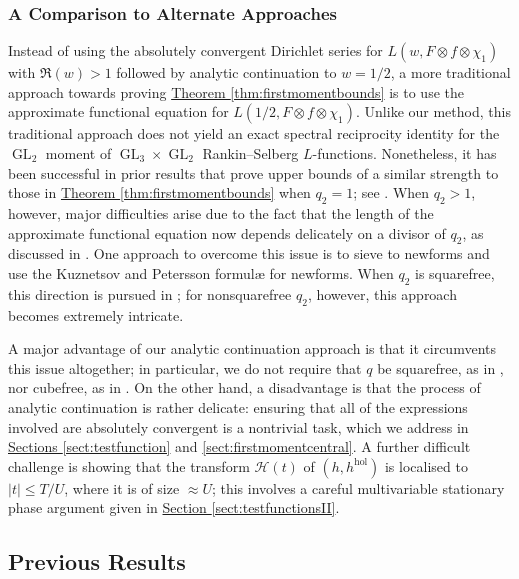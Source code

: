 \documentclass[11pt,a4paper]{amsart}
\newcommand{\HH}{\mathcal{H}}
\newcommand{\hol}{\mathrm{hol}}
\DeclareMathOperator{\GL}{GL}
\numberwithin{equation}{section}
\theoremstyle{remark}
\theoremstyle{definition}
\begin{document}
\subsubsection{A Comparison to Alternate Approaches}

Instead of using the absolutely convergent Dirichlet series for $L(w,F \otimes f \otimes \chi_1)$ with $\Re(w) > 1$ followed by analytic continuation to $w = 1/2$, a more traditional approach towards proving \hyperref[thm:firstmomentbounds]{Theorem \ref*{thm:firstmomentbounds}} is to use the approximate functional equation for $L(1/2,F \otimes f \otimes \chi_1)$. Unlike our method, this traditional approach does not yield an exact spectral reciprocity identity for the $\GL_2$ moment of $\GL_3 \times \GL_2$ Rankin--Selberg $L$-functions. Nonetheless, it has been successful in prior results that prove upper bounds of a similar strength to those in \hyperref[thm:firstmomentbounds]{Theorem \ref*{thm:firstmomentbounds}} when $q_2 = 1$; see \cite{Blo12,LNQ23}. When $q_2 > 1$, however, major difficulties arise due to the fact that the length of the approximate functional equation now depends delicately on a divisor of $q_2$, as discussed in \cite[Section 1.3]{PY19}. One approach to overcome this issue is to sieve to newforms and use the Kuznetsov and Petersson formul\ae{} for newforms. When $q_2$ is squarefree, this direction is pursued in \cite{PY19}; for nonsquarefree $q_2$, however, this approach becomes extremely intricate.

A major advantage of our analytic continuation approach is that it circumvents this issue altogether; in particular, we do not require that $q$ be squarefree, as in \cite{PY19}, nor cubefree, as in \cite{PY20}. On the other hand, a disadvantage is that the process of analytic continuation is rather delicate: ensuring that all of the expressions involved are absolutely convergent is a nontrivial task, which we address in \hyperref[sect:testfunction]{Sections \ref*{sect:testfunction}} and \ref{sect:firstmomentcentral}. A further difficult challenge is showing that the transform $\HH(t)$ of $(h,h^{\hol})$ is localised to $|t| \leq T/U$, where it is of size $\approx U$; this involves a careful multivariable stationary phase argument given in \hyperref[sect:testfunctionsII]{Section \ref*{sect:testfunctionsII}}.


\subsection{Previous Results}
\label{sect:previous}
\end{document}

